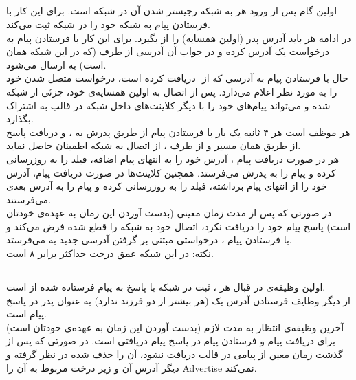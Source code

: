 \documentclass{article}
\begin{document}
\subsection{}
   اولین گام پس از ورود هر  به شبکه رجیستر شدن آن در شبکه است. برای این کار  با فرستادن پیام  به  شبکه خود را در شبکه ثبت می‌کند.\\
   در ادامه هر  باید آدرس  پدر (اولین همسایه‌) را از  بگیرد. برای این کار  با فرستادن پیام  به  درخواست یک آدرس کرده و در جواب آن آدرسی از طرف  (که در این شبکه همان  است) به  ارسال می‌شود.\\
   حال  با فرستادن پیام  به آدرسی که از ‌ دریافت کرده است، درخواست متصل شدن خود را به  مورد نظر اعلام می‌دارد.  پس از اتصال به اولین همسایه‌ی خود، جزئی از شبکه شده و می‌تواند پیام‌های خود را با دیگر کلاینت‌های داخل شبکه در قالب  به اشتراک بگذارد.\\
   هر  موظف است هر ۴ ثانیه یک بار با فرستادن پیام  از طریق پدرش به ، و دریافت پاسخ از طریق همان مسیر و از طرف ، از اتصال به شبکه اطمینان حاصل نماید.\\
   هر  در صورت دریافت پیام ، آدرس خود را به انتهای پیام اضافه، فیلد  را به روزرسانی کرده و پیام را به پدرش می‌فرستد. همچنین کلاینت‌ها در صورت دریافت پیام، آدرس خود را از انتهای پیام برداشته، فیلد  را به روزرسانی کرده و پیام را به آدرس بعدی می‌فرستند.\\
   در صورتی که پس از مدت زمان معینی (بدست آوردن این زمان به عهده‌ی خودتان است)  پاسخ پیام  خود را دریافت نکرد، اتصال خود به شبکه را قطع شده فرض می‌کند و با فرستادن پیام ، درخواستی مبتنی بر گرفتن آدرسی جدید به  می‌فرستد.\\
   نکته: در این شبکه عمق درخت حداکثر برابر ۸ است.\\
   
   
   
\subsection{}
اولین وظیفه‌ی  در قبال هر ، ثبت  در شبکه با پاسخ به پیام   فرستاده شده از  است. \\
از دیگر وظایف  فرستادن آدرس یک  (هر  بیشتر از دو فرزند ندارد) به عنوان  پدر در پاسخ پیام  است.\\
آخرین وظیفه‌ی  انتظار به مدت لازم (بدست آوردن این زمان به عهده‌ی خودتان است) برای دریافت پیام  و فرستادن پیام در پاسخ پیام دریافتی است. در صورتی که پس از گذشت زمان معین از  پیامی در قالب  دریافت نشود،  آن  را حذف شده در نظر گرفته و دیگر آدرس آن  و زیر درخت مربوط به آن را Advertise نمی‌کند.\\
\end{document}

